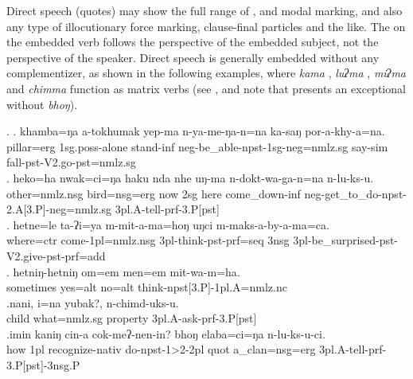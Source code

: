 Direct speech (quotes) may show the full range of ,  and modal marking, and also any type of illocutionary force marking, clause-final  particles and the like. The  on the embedded verb follows the perspective of the embedded subject, not the perspective of the speaker. Direct speech is generally embedded without any complementizer, as shown in the following examples, where \emph{kama} , \emph{luʔma} ,  \emph{miʔma}  and \emph{chimma}  function as matrix verbs (see \Next, and note that  \Next[e] presents an exceptional  without \emph{bhoŋ}).
\largerpage 

\ex. \ag. khamba=ŋa a-tokhumak yep-ma n-ya-me-ŋa-n=na ka-saŋ por-a-khy-a=na.\\
pillar{\sc =erg} {\sc 1sg.poss}-alone stand{\sc -inf} {\sc neg-}be\_able{\sc -npst-1sg-neg=nmlz.sg} say{\sc -sim} fall{\sc [3sg]-pst-V2.go-pst=nmlz.sg}\\
 
\bg. heko=ha nwak=ci=ŋa haku nda nhe uŋ-ma n-dokt-wa-ga-n=na n-lu-ks-u.\\
	other{\sc =nmlz.nsg} bird{\sc =nsg=erg}	now {\sc 2sg} here come\_down{\sc -inf} {\sc neg-}get\_to\_do{\sc -npst-2.A[3.P]-neg=nmlz.sg} 	{\sc 3pl.A}-tell-{\sc prf-3.P[pst]}\\
	 
	\bg. hetne=le ta-ʔi=ya m-mit-a-ma=hoŋ uŋci m-maks-a-by-a-ma=ca.\\
	where{\sc =ctr} come{\sc -1pl=nmlz.nsg} {\sc 3pl-}think{\sc -pst-prf=seq} {\sc 3nsg} {\sc 3pl}-be\_surprised-{\sc pst-V2.give-pst-prf=add}\\
	 
\bg. hetniŋ-hetniŋ om=em men=em mit-wa-m=ha.\\
sometimes yes{\sc =alt} no{\sc =alt} think{\sc -npst[3.P]-1pl.A=nmlz.nc}\\
\bg.nani,  i=na           yubak?, n-chimd-uks-u.\\
child what{\sc =nmlz.sg} property {\sc 3pl.A-}ask{\sc -prf-3.P[pst]}\\
 
\bg.imin kaniŋ cin-a             cok-meʔ-nen-in?             bhoŋ elaba=ci=ŋa               n-lu-ks-u-ci.\\
how {\sc 1pl} recognize{\sc -nativ} do{\sc -npst-1>2-2pl} {\sc quot} a\_clan{\sc =nsg=erg} {\sc 3pl.A-}tell{\sc -prf-3.P[pst]-3nsg.P}\\
 


